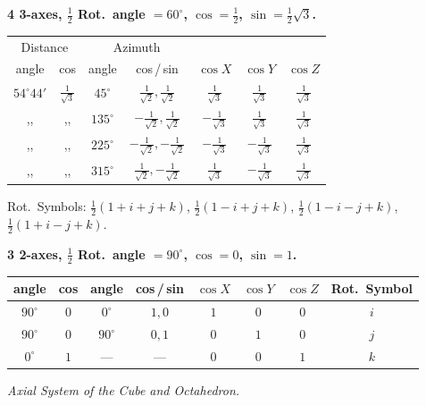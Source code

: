 \documentclass[11pt]{article}
\begin{document}
\noindent\textbf{4 3-axes, $\tfrac{1}{2}$ Rot.~angle $= 60^\circ$, $\cos = \tfrac{1}{2}$, $\sin = \tfrac{1}{2}\sqrt{3}$.}
\begin{center}
\begin{tabular}{|c|c|c|c|c|c|c|}\hline
\multicolumn{2}{|c|}{Distance} & \multicolumn{2}{c|}{Azimuth} & & & \\
angle & cos & angle & cos\,/\,sin & $\cos X$ & $\cos Y$ & $\cos Z$ \\\hline
$54^\circ 44'$ & $\tfrac{1}{\sqrt{3}}$ & $45^\circ$ & $\tfrac{1}{\sqrt{2}},\tfrac{1}{\sqrt{2}}$ & $\tfrac{1}{\sqrt{3}}$ & $\tfrac{1}{\sqrt{3}}$ & $\tfrac{1}{\sqrt{3}}$ \\
,, & ,, & $135^\circ$ & $-\tfrac{1}{\sqrt{2}},\tfrac{1}{\sqrt{2}}$ & $-\tfrac{1}{\sqrt{3}}$ & $\tfrac{1}{\sqrt{3}}$ & $\tfrac{1}{\sqrt{3}}$ \\
,, & ,, & $225^\circ$ & $-\tfrac{1}{\sqrt{2}},-\tfrac{1}{\sqrt{2}}$ & $-\tfrac{1}{\sqrt{3}}$ & $-\tfrac{1}{\sqrt{3}}$ & $\tfrac{1}{\sqrt{3}}$ \\
,, & ,, & $315^\circ$ & $\tfrac{1}{\sqrt{2}},-\tfrac{1}{\sqrt{2}}$ & $\tfrac{1}{\sqrt{3}}$ & $-\tfrac{1}{\sqrt{3}}$ & $\tfrac{1}{\sqrt{3}}$ \\\hline
\end{tabular}
\end{center}
\noindent Rot.~Symbols: $\tfrac{1}{2}(1 + i + j + k)$, $\tfrac{1}{2}(1 - i + j + k)$, $\tfrac{1}{2}(1 - i - j + k)$, $\tfrac{1}{2}(1 + i - j + k)$.

\medskip
\noindent\textbf{3 2-axes, $\tfrac{1}{2}$ Rot.~angle $= 90^\circ$, $\cos = 0$, $\sin = 1$.}
\begin{center}
\begin{tabular}{|c|c|c|c|c|c|c|c|}\hline
angle & cos & angle & cos\,/\,sin & $\cos X$ & $\cos Y$ & $\cos Z$ & Rot.~Symbol \\\hline
$90^\circ$ & $0$ & $0^\circ$ & $1,0$ & $1$ & $0$ & $0$ & $i$ \\
$90^\circ$ & $0$ & $90^\circ$ & $0,1$ & $0$ & $1$ & $0$ & $j$ \\
$0^\circ$ & $1$ & --- & --- & $0$ & $0$ & $1$ & $k$ \\\hline
\end{tabular}
\end{center}

\medskip
\begin{center}\emph{Axial System of the Cube and Octahedron.}\end{center}
\medskip
\end{document}
